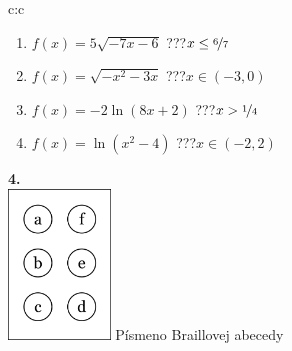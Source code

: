\documentclass[10pt]{report}
\begin{document}
\begin{tabular}{c:c}
\begin{minipage}[c][99mm][t]{0.49\linewidth}
\begin{center}
\begin{minipage}{0.77\linewidth}
\begin{center}
\begin{varwidth}{\textwidth}
\begin{enumerate}
\item $f(x)=5\sqrt{-7x-6}$\quad \dotfill\; ???\;\dotfill \quad $x\leq\nicefrac{6}{7}$
\item $f(x)=\sqrt{-x^2-3x}$\quad \dotfill\; ???\;\dotfill \quad $x\in(-3 , 0)$
\item $f(x)=-2\ln{(8x+2)}$\quad \dotfill\; ???\;\dotfill \quad $x>\nicefrac{1}{4}$
\item $f(x)=\ln{(x^2-4)}$\quad \dotfill\; ???\;\dotfill \quad $x\in(-2 , 2)$
\end{enumerate}
\end{varwidth}
\end{center}
\end{minipage}
\begin{minipage}{0.20\linewidth}
\begin{center}
{\Huge\bfseries 4.} \\[2mm]
\includegraphics[height=40mm]{../images/braille.png}
{\small Písmeno Braillovej abecedy}
\end{center}
\end{minipage}
\end{center}
\end{minipage}
%
\end{tabular}
\newpage
\thispagestyle{empty}
\end{document}
